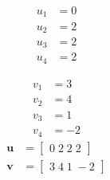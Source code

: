 \[\begin{aligned}
u_{1} &= 0 \\
u_{2} &= 2 \\
u_{3} &= 2 \\
u_{4} &= 2 
\end{aligned}\]

\[\begin{aligned}
v_{1} &= 3 \\
v_{2} &= 4 \\
v_{3} &= 1 \\
v_{4} &= -2 
\end{aligned}\]
\[\begin{aligned}
\mathbf{u} &= \begin{bmatrix}0\;2\;2\;2\end{bmatrix} \\
\mathbf{v} &= \begin{bmatrix}3\;4\;1\;-2\end{bmatrix}
\end{aligned}\]

